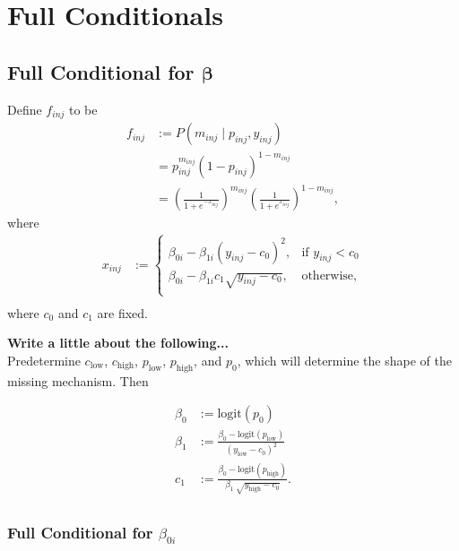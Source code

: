 \documentclass[12pt]{article}
\def\logit{\text{logit}}
\begin{document}
\section{Full Conditionals}\label{full-conditionals}

\subsection{\texorpdfstring{Full Conditional for
$\bm \beta$}{Full Conditional for \textbackslash{}bm \textbackslash{}beta}}\label{full-conditional-for-bm-beta}

Define $f_{inj}$ to be
%
\begin{align*}
f_{inj} &:= P(m_{inj} \mid p_{inj}, y_{inj}) \\
&= p_{inj}^{m_{inj}} (1-p_{inj})^{1 - m_{inj}} \\
&= \left(\frac{1}{1+e^{-x_{inj}}} \right)^{m_{inj}}\left(\frac{1}{1+e^{x_{inj}}} \right)^{1-m_{inj}},
\end{align*}
%
where
\begin{align*}
  x_{inj} &:= \begin{cases}
  \beta_{0i} - \beta_{1i}(y_{inj}-c_0)^2, & \text{if } y_{inj} < c_0\nonumber \\
  \beta_{0i} - \beta_{1i}c_1\sqrt{y_{inj}-c_0}, & \text{otherwise}, \nonumber \\
  \end{cases}\\
\end{align*}
where $c_0$ and $c_1$ are fixed.


\textbf{Write a little about the following...} \\
Predetermine $c_\text{low}$, $c_\text{high}$, $p_\text{low}$, $p_\text{high}$, and
$p_0$, which will determine the shape of the missing mechanism. Then

\begin{align*}
  \beta_0 &:= \logit(p_0) \\
  \beta_1 &:= \frac{\beta_0 - \logit(p_\text{low})}{(y_\text{low} - c_0)^2} \\
  c_1 &:= \frac{\beta_0 - \logit(p_\text{high})}{\beta_1 ~ \sqrt{y_\text{high} - c_0} }. \\
\end{align*}


\subsubsection{\texorpdfstring{Full Conditional for
$\beta_{0i}$}{Full Conditional for \textbackslash{}beta\_\{0i\}}}\label{full-conditional-for-beta_0i}
\end{document}
